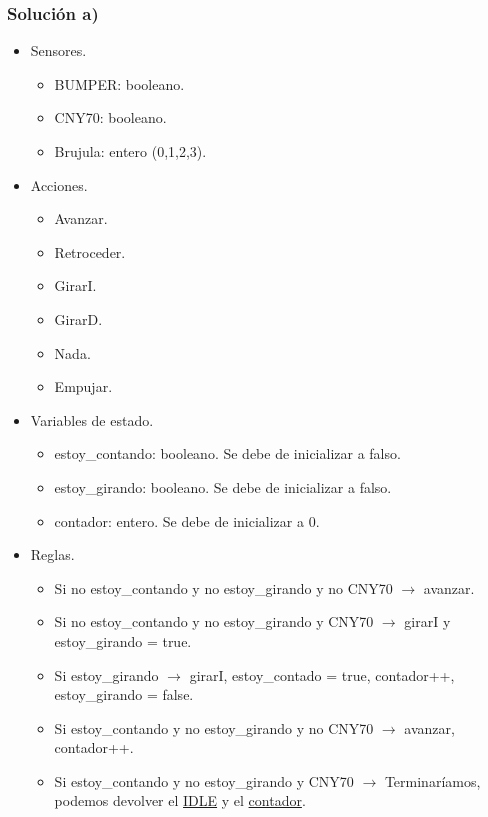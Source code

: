 \subsubsection*{Solución a)}

\begin{itemize}
    \item Sensores.
    \begin{itemize}
        \item BUMPER: booleano.
        \item CNY70: booleano.
        \item Brujula: entero (0,1,2,3).
    \end{itemize}
    \item Acciones.
    \begin{itemize}
        \item Avanzar.
        \item Retroceder.
        \item GirarI.
        \item GirarD.
        \item Nada.
        \item Empujar.
    \end{itemize}
    \item Variables de estado.
    \begin{itemize}
        \item estoy\_contando: booleano. Se debe de inicializar a falso.
        \item estoy\_girando: booleano. Se debe de inicializar a falso.
        \item contador: entero. Se debe de inicializar a 0.
    \end{itemize}
    \item Reglas.
    \begin{itemize}
        \item Si no estoy\_contando y no estoy\_girando y no CNY70 $\rightarrow$ avanzar.
        \item Si no estoy\_contando y no estoy\_girando y CNY70 $\rightarrow$ girarI y estoy\_girando = true.
        \item Si estoy\_girando $\rightarrow$ girarI, estoy\_contado = true, contador++, estoy\_girando = false.
        \item Si estoy\_contando y no estoy\_girando y no CNY70 $\rightarrow$ avanzar, contador++.
        \item Si estoy\_contando y no estoy\_girando y CNY70 $\rightarrow$ Terminaríamos, podemos devolver el \underline{IDLE} y el \underline{contador}.
        \end{itemize}
\end{itemize}

